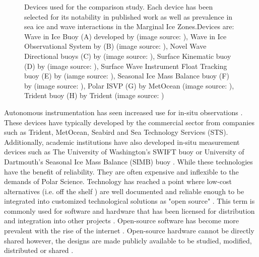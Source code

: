 \begin{figure}[H]
\begin{subfigure}[b]{0.24\textwidth}
         \centering
         \label{fig:trident}
    \end{subfigure}%
    \hfill
    \caption{ Devices used for the comparison study. Each device has been selected for its notability in published work as well as prevalence in sea ice and wave interactions in the Marginal Ice Zones.Devices are: Wave in Ice Buoy (A) developed by \textcite{rabault2017measurements} (image source: \cite{rabault2017measurements}), Wave in Ice Observational System by \textcite{kohout2015device} (B) (image source: \cite{kohout2020observation}), Novel Wave Directional buoys  (C) by \textcite{doble2017robust} (image source: \cite{doble_wave_2015}), Surface Kinematic buoy (D) by \textcite{guimaraes2018surface} (image source: \cite{guimaraes2018surface}),  Surface Wave Instrument Float Tracking buoy (E) by \textcite{thomson2012wave} (iamge source: \cite{jim_swift_2012}), Seasonal Ice Mass Balance buoy (F) by \textcite{polashenski2011seasonal} (image source: \cite{simbpic}), Polar ISVP (G) by MetOcean (image source: \cite{uptempo}), Trident buoy (H) by Trident (image source: \cite{trident})}
    \label{fig:buoys}
\end{figure}

Autonomous instrumentation has seen increased use for in-situ observations \cite{kennicutt2016delivering}. These devices have typically developed by the commercial sector  \cite{rabault2017measurements}  from companies such as Trident, MetOcean, Seabird and Sea Technology Services (STS). Additionally, academic institutions have also developed in-situ measurement devices such as The University of Washington's SWIFT buoy \cite{thomson2012wave} or University of Dartmouth's Seasonal Ice Mass Balance (SIMB) buoy \cite{polashenski2011seasonal}. While these technologies have the benefit of reliability. They are often expensive \cite{rabault2017measurements} and inflexible to the demands of Polar Science. Technology has reached a point where low-cost alternatives (i.e. off the shelf ) are well documented and reliable enough to be integrated into customized technological solutions as "open source" \cite{rabault2019open}. This term is commonly used for software and hardware that has been licensed for distribution and integration into other projects \cite{bonvoisin2017source}. Open-source software has become more prevalent with the rise of the internet \cite{bonvoisin2017source}. Open-source hardware cannot be directly shared however, the designs are made publicly available to be studied, modified, distributed or shared \cite{bonvoisin2017source}.\par 

